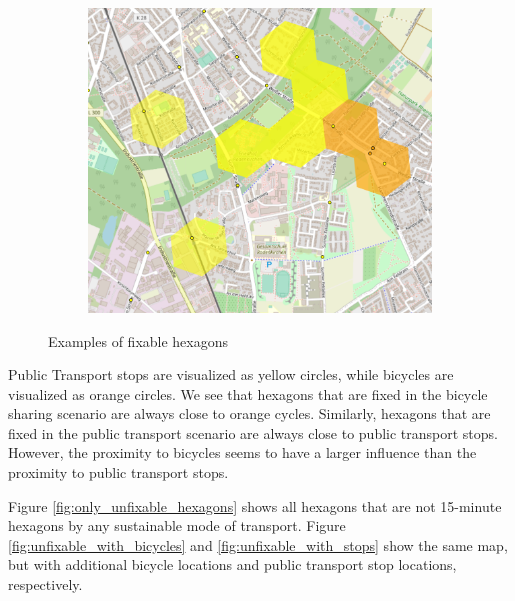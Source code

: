 \begin{figure}
\begin{subfigure}[b]{0.45\textwidth}
     \end{subfigure}
     \hfill
     \begin{subfigure}[b]{0.45\textwidth}
         \centering
         \includegraphics[width=\textwidth]{Figures/results/problematic_hexagons/example_4.png}
     \end{subfigure}
     \caption{Examples of fixable hexagons}
        \label{fig:fixable_hexagons_examples}
\end{figure}

Public Transport stops are visualized as yellow circles, while bicycles are visualized as orange circles.
We see that hexagons that are fixed in the bicycle sharing scenario are always close to orange cycles.
Similarly, hexagons that are fixed in the public transport scenario are always close to public transport stops.
However, the proximity to bicycles seems to have a larger influence than the proximity to public transport stops.


Figure \ref{fig:only_unfixable_hexagons} shows all hexagons that are not 15-minute hexagons by any sustainable mode of transport.
Figure \ref{fig:unfixable_with_bicycles} and \ref{fig:unfixable_with_stops} show the same map, but with additional bicycle locations and public transport stop locations, respectively.

